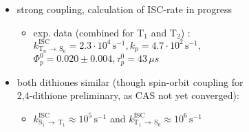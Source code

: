 \documentclass[25pt, portrait]{tikzposter}
\begin{document}
\begin{columns}
{\begin{minipage}[t]{0.595\colwidth}
{\begin{adjustbox}{valign=t}
\begin{minipage}[t]{24.6cm}
\begin{center}
\begin{itemize}
\begin{itemize}
		\item moderately high rate compared to exp.$\;$data \cite{falk1989}:\\ $\tau(\mathrm{S}_2)=0.3\,$ps, $k_f=6\cdot10^8\,\mathrm{s}^{-1}$, $k_{nr}=3\cdot10^{12}\,\mathrm{s}^{-1}$\\ $\Phi_f=1.7\cdot10^{-4}$, $\Phi_p^0=0.023$, $k^\mathrm{IC}_{\mathrm{S}_2\,\rightarrow\,\mathrm{S}_1}<10^8\,\mathrm{s}^{-1}$
		\item according to Ref.~\cite{falk1989} relaxation mainly via intermediate 'X' located on S$_2$-surface, with longer $\tau$ ($200\,$-$\,250\,$ps)  
		\end{itemize}
			\item strong coupling, calculation of ISC-rate in progress
			\begin{itemize}
		     \item exp.$\;$data (combined for T$_1$ and T$_2$) \cite{falk1990}:\\$ k^\mathrm{ISC}_{\mathrm{T}_n\,\rightarrow\,\mathrm{S}_0}=2.3\cdot10^4\,\mathrm{s}^{-1},k_p=4.7\cdot10^2\,\mathrm{s}^{-1},$\\$\Phi_p^0=0.020 \pm 0.004, \tau_p^0=43\,\mu s$ 
			\end{itemize}
		\end{itemize}
		\vspace{0.3cm}
		\begin{itemize}
			\item both dithiones similar (though spin-orbit coupling for \\2,4-dithione preliminary, as CAS not yet converged): 
				\begin{itemize}
				\item 
$k^\mathrm{ISC}_{\mathrm{S}_1\,\rightarrow\,\mathrm{T}_1}\approx 10^5\,\mathrm{s}^{-1}$ and $k^\mathrm{ISC}_{\mathrm{T}_1\,\rightarrow\,\mathrm{S}_0}\approx 10^6\,\mathrm{s}^{-1}$ 
			 

\end{itemize}
\end{itemize}
\end{center}
\end{minipage}
\end{adjustbox}}
\end{minipage}}
\end{columns}
\end{document}
